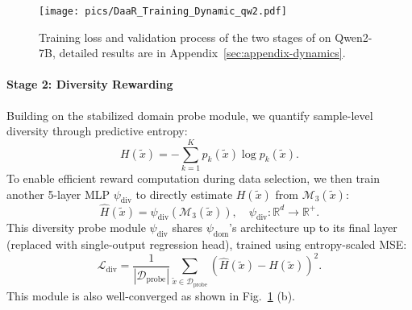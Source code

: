 \begin{figure}[h]
\centering
\texttt{[image: pics/DaaR\_Training\_Dynamic\_qw2.pdf]}
\caption{Training loss and validation process of the two stages of \ours on Qwen2-7B, detailed results are in Appendix~\ref{sec:appendix-dynamics}.}
\label{fig:DaaR-dynamic}
\end{figure}

\paragraph{Stage 2: Diversity Rewarding}
Building on the stabilized domain probe module, we quantify sample-level diversity through predictive entropy:
\begin{equation}
H(\tilde{x}) = -\sum_{k=1}^K p_k(\tilde{x})\log p_k(\tilde{x}).
\end{equation}
To enable efficient reward computation during data selection, we then train another 5-layer MLP $\psi_{\text{div}}$ to directly estimate $H(\tilde{x})$ from $\mathcal{M}_3(\tilde{x})$:
\begin{equation}
\hat{H}(\tilde{x}) = \psi_{\text{div}}(\mathcal{M}_3(\tilde{x})), \quad \psi_{\text{div}}:\mathbb{R}^d\rightarrow\mathbb{R}^+.
\end{equation}
This diversity probe module $\psi_{\text{div}}$ shares $\psi_{\text{dom}}$'s architecture up to its final layer (replaced with single-output regression head), trained using entropy-scaled MSE:
\begin{equation}
\mathcal{L}_{\text{div}} = \frac{1}{|\mathcal{D}_{\text{probe}}|}\sum_{\tilde{x}\in\mathcal{D}_{\text{probe}}} \left(\hat{H}(\tilde{x}) - H(\tilde{x})\right)^2.
\end{equation}
This module is also well-converged as shown in Fig.~\ref{fig:DaaR-dynamic} (b).

